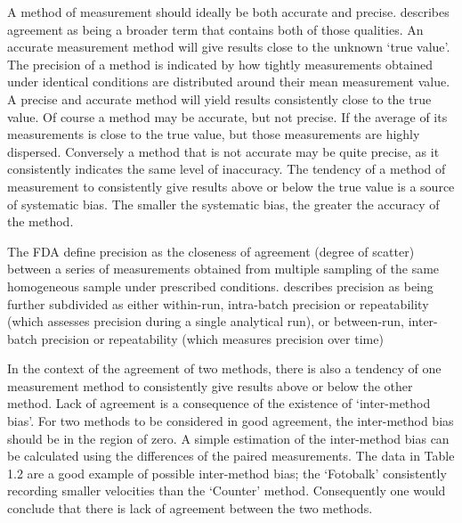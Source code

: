 \documentclass[12pt, a4paper]{report}
\begin{document}
A method of measurement should ideally be both accurate and
precise. \citet{Barnhart} describes agreement as being a broader
term that contains both of those qualities. An accurate
measurement method will give results close to the unknown `true
value'. The precision of a method is indicated by how tightly
measurements obtained under identical conditions are distributed
around their mean measurement value. A precise and accurate method
will yield results consistently close to the true value. Of course
a method may be accurate, but not precise. If the average of its
measurements is close to the true value, but those measurements
are highly dispersed. Conversely a method that is not accurate may
be quite precise, as it consistently indicates the same level of
inaccuracy. The tendency of a method of measurement to
consistently give results above or below the true value is a
source of systematic bias. The smaller the systematic bias, the
greater the accuracy of the method.


The FDA define precision as the closeness of agreement (degree of
scatter) between a series of measurements obtained from multiple
sampling of the same homogeneous sample under prescribed
conditions. \citet{Barnhart} describes precision as being further
subdivided as either within-run, intra-batch precision or
repeatability (which assesses precision during a single analytical
run), or between-run, inter-batch precision or repeatability
(which measures precision over time)

In the context of the agreement of two methods, there is also a
tendency of one measurement method to consistently give results
above or below the other method. Lack of agreement is a
consequence of the existence of `inter-method bias'. For two
methods to be considered in good agreement, the inter-method bias
should be in the region of zero. A simple estimation of the
inter-method bias can be calculated using the differences of the
paired measurements. The data in Table 1.2 are a good example of
possible inter-method bias; the `Fotobalk' consistently recording
smaller velocities than the `Counter' method. Consequently one
would conclude that there is lack of agreement between the two
methods.
\end{document}
